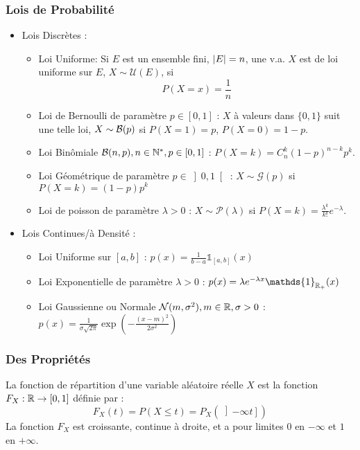 \documentclass{cours}
\begin{document}
    \subsubsection{Lois de Probabilité}
    \begin{definition}
        \begin{itemize}
            \item Lois Discrètes : 
            \begin{itemize}
                \item Loi Uniforme: Si $E$ est un ensemble fini, $\left|E\right| = n$, une v.a. $X$ est de loi uniforme sur $E$, $X \sim \mathcal{U}(E)$, si \[P(X = x) = \frac{1}{n}\]
                \item Loi de Bernoulli de paramètre $p \in \left[0, 1\right]$ : $X$ à valeurs dans $\{0, 1\}$ suit une telle loi, $X \sim \mathcal{B}(p)$ si $P(X = 1) = p$, $P(X = 0) = 1- p$.
                \item Loi Binômiale $\mathcal{B}(n, p), n\in \mathbb{N}^{*}, p\in\left[0, 1\right]$ : $P(X = k) = C_{n}^{k}\left(1 - p\right)^{n - k}p^{k}$. 
                \item Loi Géométrique de paramètre $p \in \left]0, 1\right[$ : $X \sim \mathcal{G}(p)$ si $P(X = k) = \left(1 - p\right)p^{k}$
                \item Loi de poisson de paramètre $\lambda > 0$ : $X \sim \mathcal{P}(\lambda)$ si $P(X = k) = \frac{\lambda^{k}}{k!}e^{-\lambda}$. 
            \end{itemize}
            \item Lois Continues/à Densité : 
            \begin{itemize}
                \item Loi Uniforme sur $\left[a, b\right]$ : $p(x) = \frac{1}{b - a}\mathds{1}_{\left[a, b\right]}(x)$
                \item Loi Exponentielle de paramètre $\lambda > 0$ : $p(x) = \lambda e^{-\lambda x}\mathds{1}_{\R_{+}}(x)$
                \item Loi Gaussienne ou Normale $\mathcal{N}(m,\sigma^{2}), m \in \mathbb{R}, \sigma > 0$ : $p(x) = \frac{1}{\sigma\sqrt{2\pi}} \exp\left(- \frac{\left(x - m\right)^{2}}{2 \sigma^{2}}\right)$
            \end{itemize}
        \end{itemize}
    \end{definition}

    \subsubsection{Des Propriétés}
    \begin{definition}
        La fonction de répartition d'une variable aléatoire réelle $X$ est la fonction $F_{X} : \mathbb{R} \rightarrow \left[0, 1\right]$ définie par : 
        \[
            F_{X}(t) = P(X \leq t) = P_{X}\left(\left]- \infty t\right]\right)
        \]
        La fonction $F_{X}$ est croissante, continue à droite, et a pour limites $0$ en $-\infty$ et $1$ en $+\infty$.
    \end{definition}
\end{document}
